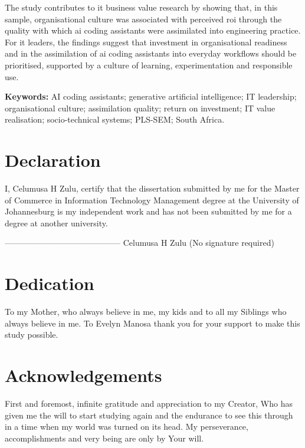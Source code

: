 \documentclass[11pt]{report}
\newenvironment{keyword}{\par\noindent\textbf{Keywords:} }{\par}
\newcommand{\name}{Celumusa H Zulu}
\newcommand{\degree}{Master of Commerce}
\newcommand{\programme}{Information Technology Management}
\begin{document}
The study contributes to \gls{it} business value research by showing that, in this sample, organisational culture was associated with perceived \gls{roi} through the quality with which \gls{ai} coding assistants were assimilated into engineering practice. For \gls{it} leaders, the findings suggest that investment in organisational readiness and in the assimilation of \gls{ai} coding assistants into everyday workflows should be prioritised, supported by a culture of learning, experimentation and responsible use.

\begin{keyword}
AI coding assistants; generative artificial intelligence; IT leadership; organisational culture; assimilation quality; return on investment; IT value realisation; socio-technical systems; PLS-SEM; South Africa.
 
\end{keyword}

\chapter*{Declaration}
I, {\name}, certify that the dissertation submitted by me for the {\degree} in {\programme} degree at the University of Johannesburg is my independent work and has not been submitted by me for a degree at another university.

\vspace{2cm}
------------------------------------------ \newline
{\textsc \name} \newline
(No signature required)

\chapter*{Dedication}
To my Mother, who always believe in me,	my kids and to all my Siblings who always believe in me. \newline To Evelyn Manosa thank you for your support to make this study possible.

\chapter*{Acknowledgements}
First and foremost, infinite gratitude and appreciation to my Creator, Who has given me the
will to start studying again and the endurance to see this through in a time when my world was
turned on its head. My perseverance, accomplishments and very being are only by Your will.
\end{document}
